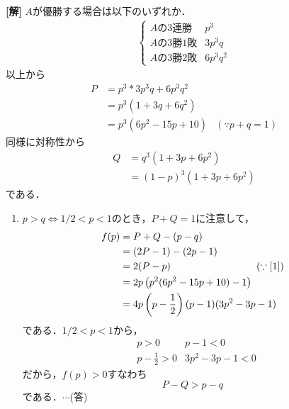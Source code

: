 \documentclass[a4j]{jarticle}
\begin{document}
\setlength{\columnseprule}{0.4pt}
\begin{multicols}{2}
{\bf[解]} $A$が優勝する場合は以下のいずれか．
     \begin{align}
     \left\{
          \begin{array}{ll}
          \text{$A$の$3$連勝}&p^3 \\
          \text{$A$の$3$勝$1$敗}& 3p^3q \\
          \text{$A$の$3$勝$2$敗}& 6p^3q^2
          \end{array}\right.\label{0}
     \end{align}
以上から
     \begin{align}
     P&=p^3*3p^3q+6p^3q^2 \nonumber\\
     &=p^3(1+3q+6q^2) \nonumber\\
     &=p^3(6p^2-15p+10)&(\because p+q=1)\label{1}
     \end{align}
同様に対称性から
     \begin{align}
     Q&=q^3(1+3p+6p^2) \\
     &=(1-p)^3(1+3p+6p^2)\label{2}
     \end{align}
である．
     \begin{enumerate}[(1)]
     \item $p>q\Longleftrightarrow 1/2<p<1$のとき，$P+Q=1$に注意して，
          \begin{align*}
          f(p)&=P+Q-(p-q) \\
          &=(2P-1)-(2p-1) \\
          &=2(P-p)\ \ \ \ \ \ \ \ \ \ \ \ \ \ \ \ \ \ \ \ \ \ \ \ \ \ (\because \eqref{1}) \\
          &=2p\left(p^2(6p^2-15p+10)-1\right) \\
          &=4p\left(p-\frac{1}{2}\right)(p-1)(3p^2-3p-1)
          \end{align*}     
     である．$1/2<p<1$から，
          \begin{align*}
          &p>0&p-1<0 \\
          &p-\frac{1}{2}>0&3p^2-3p-1<0
          \end{align*}
     だから，$f(p)>0$すなわち
          \[P-Q>p-q\]
     である．$\cdots$(答)
     

\end{enumerate}
\end{multicols}
\end{document}
